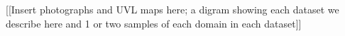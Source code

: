 \documentclass{article}
\begin{document}
[[Insert photographs and UVL maps here; a digram showing each dataset we describe here and 1 or two samples of each domain in each dataset]]





\end{document}
